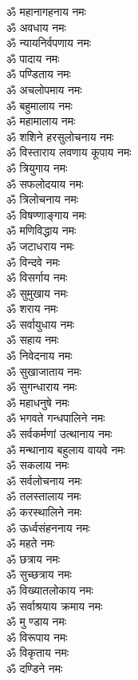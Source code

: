 \begin{multicols}{2}
\begin{flushleft}
ॐ महानागहनाय नमः\hfill{}\\
ॐ अवधाय नमः\\
ॐ न्यायनिर्वपणाय नमः\\
ॐ पादाय नमः\\
ॐ पण्डिताय नमः\\
ॐ अचलोपमाय नमः\\
ॐ बहुमालाय नमः\\
ॐ महामालाय नमः\\
ॐ शशिने हरसुलोचनाय नमः\\
ॐ विस्ताराय लवणाय कूपाय नमः\\
ॐ त्रियुगाय नमः\hfill{}\\
ॐ सफलोदयाय नमः\\
ॐ त्रिलोचनाय नमः\\
ॐ विषण्णाङ्गाय नमः\\
ॐ मणिविद्धाय नमः\\
ॐ जटाधराय नमः\\
ॐ विन्दवे नमः\\
ॐ विसर्गाय नमः\\
ॐ सुमुखाय नमः\\
ॐ शराय नमः\\
ॐ सर्वायुधाय नमः\hfill{}\\
ॐ सहाय नमः\\
ॐ निवेदनाय नमः\\
ॐ सुखाजाताय नमः\\
ॐ सुगन्धाराय नमः\\
ॐ महाधनुषे नमः\\
ॐ भगवते गन्धपालिने नमः\\
ॐ सर्वकर्मणां उत्थानाय नमः\\
ॐ मन्थानाय बहुलाय वायवे नमः\\
ॐ सकलाय नमः\\
ॐ सर्वलोचनाय नमः\hfill{}\\
ॐ तलस्तालाय नमः\\
ॐ करस्थालिने नमः\\
ॐ ऊर्ध्वसंहननाय नमः\\
ॐ महते नमः\\
ॐ छत्राय नमः\\
ॐ सुच्छत्राय नमः\\
ॐ विख्यातलोकाय नमः\\
ॐ सर्वाश्रयाय क्रमाय नमः\\
ॐ मु ण्डाय नमः\\
ॐ विरूपाय नमः\hfill{}\\
ॐ विकृताय नमः\\
ॐ दण्डिने नमः\\

\end{flushleft}
\end{multicols}
